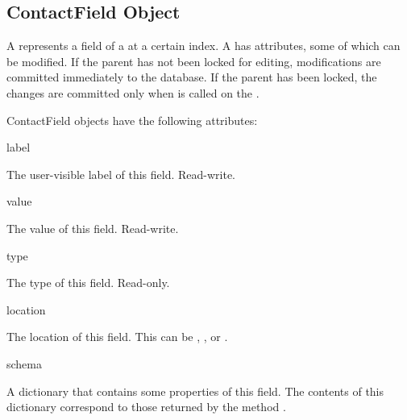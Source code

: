 \subsection{ContactField Object}
\label{subsec:contactfield}

A  represents a field of a  at a 
certain index. A  has attributes, some of which can be 
modified. If the parent  has not been locked for editing, 
modifications are committed immediately to the database. If the parent 
 has been locked, the changes are committed only when 
 is called on the .

\begin{classdesc*}{ContactField}
 objects have the following attributes:

\begin{memberdesc}[ContactField]{label}

The user-visible label of this field. Read-write.

\end{memberdesc}

\begin{memberdesc}[ContactField]{value}

The value of this field. Read-write.

\end{memberdesc}

\begin{memberdesc}[ContactField]{type}

The type of this field. Read-only.

\end{memberdesc}

\begin{memberdesc}[ContactField]{location}

The location of this field. This can be , , or 
.

\end{memberdesc}

\begin{memberdesc}[ContactField]{schema}

A dictionary that contains some properties of this field. The contents of this 
dictionary correspond to those returned by the  method 
.

\end{memberdesc}

\end{classdesc*}



